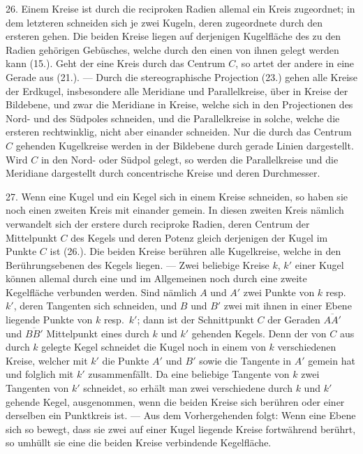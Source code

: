 26. Einem Kreise ist durch die reciproken Radien allemal
ein Kreis zugeordnet; in dem letzteren schneiden sich
je zwei Kugeln, deren zugeordnete durch den ersteren gehen.
Die beiden Kreise liegen auf derjenigen Kugelfl\"ache des zu
den Radien geh\"origen Geb\"usches, welche durch den einen
von ihnen gelegt werden kann (15.). Geht der eine Kreis
durch das Centrum $C$, so artet der andere in eine Gerade
aus (21.). --- Durch die stereographische Projection (23.)
gehen alle Kreise der Erdkugel, insbesondere alle Meridiane
und Parallelkreise, \"uber in Kreise der Bildebene, und zwar
die Meridiane in Kreise, welche sich in den Projectionen des
Nord- und des S\"udpoles schneiden, und die Parallelkreise in
solche, welche die ersteren rechtwinklig, nicht aber einander
schneiden. Nur die durch das Centrum $C$ gehenden Kugelkreise
werden in der Bildebene durch gerade Linien dargestellt.
Wird $C$ in den Nord- oder S\"udpol gelegt, so werden
die Parallelkreise und die Meridiane dargestellt durch concentrische
Kreise und deren Durchmesser.

27. Wenn eine Kugel und ein Kegel sich in einem
Kreise schneiden, so haben sie noch einen zweiten Kreis mit
einander gemein. In diesen zweiten Kreis n\"amlich verwandelt
sich der erstere durch reciproke Radien, deren Centrum
der Mittelpunkt $C$ des Kegels und deren Potenz gleich derjenigen
der Kugel im Punkte $C$ ist (26.). Die beiden Kreise
ber\"uhren alle Kugelkreise, welche in den Ber\"uhrungsebenen
des Kegels liegen. --- Zwei beliebige Kreise $k$, $k'$ einer Kugel
k\"onnen allemal durch eine und im Allgemeinen noch durch
eine zweite Kegelfl\"ache verbunden werden. Sind n\"amlich $A$
und $A'$ zwei Punkte von $k$ resp.\ $k'$, deren Tangenten sich
schneiden, und $B$ und $B'$ zwei mit ihnen in einer Ebene
liegende Punkte von $k$ resp.\ $k'$; dann ist der Schnittpunkt $C$
der Geraden $\overline{AA'}$ und $\overline{BB'}$ Mittelpunkt eines durch $k$ und $k'$
gehenden Kegels. Denn der von $C$ aus durch $k$ gelegte
Kegel schneidet die Kugel noch in einem von $k$ verschiedenen
Kreise, welcher mit $k'$ die Punkte $A'$ und $B'$ sowie die Tangente
in $A'$ gemein hat und folglich mit $k'$ zusammenf\"allt.
Da eine beliebige Tangente von $k$ zwei Tangenten von $k'$
schneidet, so erh\"alt man zwei verschiedene durch $k$ und $k'$
gehende Kegel, ausgenommen, wenn die beiden Kreise sich
ber\"uhren oder einer derselben ein Punktkreis ist. --- Aus dem
Vorhergehenden folgt: Wenn eine Ebene sich so bewegt,
dass sie zwei auf einer Kugel liegende Kreise fortw\"ahrend
ber\"uhrt, so umh\"ullt sie eine die beiden Kreise verbindende
Kegelfl\"ache.


